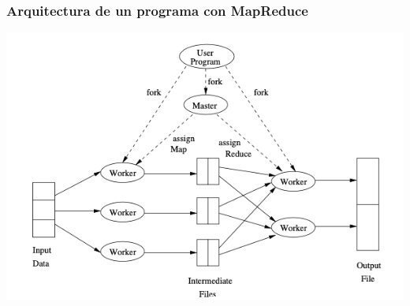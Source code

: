 \documentclass[
10pt, %
aspectratio=169, %
]{beamer}
\begin{document}
	\begin{frame}
		
		\frametitle{Arquitectura de un programa con MapReduce}
		
		\centering
		\includegraphics[scale=0.55]{arquitectura-map-reduce.png}
		
		
		
	\end{frame}
	
\end{document}

